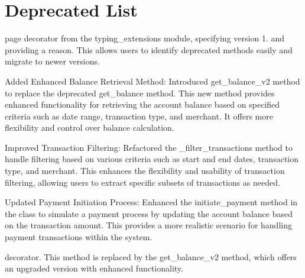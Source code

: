 \chapter{Deprecated List}
\hypertarget{deprecated}{}\label{deprecated}

\begin{DoxyRefList}
\item[page \doxylink{index}{Credit Card Management API (Version 1.5)} ]\label{deprecated__deprecated000001}%
%
decorator from the typing\+\_\+extensions module, specifying version 1. and providing a reason. This allows users to identify deprecated methods easily and migrate to newer versions.
\begin{DoxyItemize}
\item Added Enhanced Balance Retrieval Method\+: Introduced get\+\_\+balance\+\_\+v2 method to replace the deprecated get\+\_\+balance method. This new method provides enhanced functionality for retrieving the account balance based on specified criteria such as date range, transaction type, and merchant. It offers more flexibility and control over balance calculation.
\item Improved Transaction Filtering\+: Refactored the \+\_\+filter\+\_\+transactions method to handle filtering based on various criteria such as start and end dates, transaction type, and merchant. This enhances the flexibility and usability of transaction filtering, allowing users to extract specific subsets of transactions as needed.
\item Updated Payment Initiation Process\+: Enhanced the initiate\+\_\+payment method in the  class to simulate a payment process by updating the account balance based on the transaction amount. This provides a more realistic scenario for handling payment transactions within the system.
\end{DoxyItemize}

\label{deprecated__deprecated000002}%
%
decorator. This method is replaced by the get\+\_\+balance\+\_\+v2 method, which offers an upgraded version with enhanced functionality.
\end{DoxyRefList}